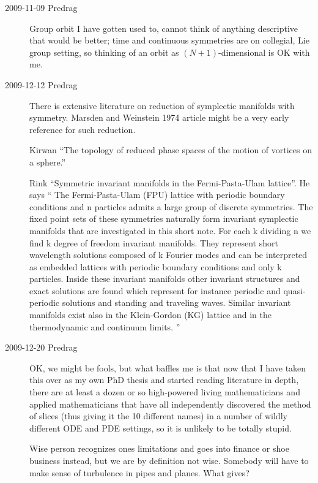 \begin{description}
\item[2009-11-09 Predrag]
Group orbit I have gotten used to, cannot think of anything descriptive
that would be better; time and continuous symmetries are on collegial,
Lie group setting, so thinking of an orbit as $(N+1)$-dimensional is OK
with me.

\renewcommand{\LieEl}{\ensuremath{g}}  %
\renewcommand{\gSpace}{\ensuremath{\theta}}   %
\renewcommand{\ssp}{x}
\renewcommand{\sspRed}{\ensuremath{\hat{x}}}  %

\item[2009-12-12 Predrag]
There is extensive literature on reduction of symplectic manifolds with
symmetry.
Marsden and Weinstein 1974 article
might be a very early reference for such reduction.

Kirwan ``The topology of reduced phase spaces of
the motion of vortices on a sphere.''

 Rink
``Symmetric invariant manifolds in
  the  {Fermi-Pasta-Ulam} lattice''. He says ``
The Fermi-Pasta-Ulam (FPU) lattice with periodic boundary
conditions and n particles admits a large group of discrete
symmetries. The fixed point sets of these symmetries naturally
form invariant symplectic manifolds that are investigated in
this short note. For each k dividing n we find k degree of
freedom invariant manifolds. They represent short wavelength
solutions composed of k Fourier modes and can be interpreted as
embedded lattices with periodic boundary conditions and only k
particles. Inside these invariant manifolds other invariant
structures and exact solutions are found which represent for
instance periodic and quasi-periodic solutions and standing and
traveling waves. Similar invariant manifolds exist also in the
Klein-Gordon (KG) lattice and in the thermodynamic and
continuum limits.
''

\item[2009-12-20 Predrag]
	OK, we might be fools, but what baffles me is that now
that I have taken this over as my own PhD thesis and started
reading literature in depth, there are at least a dozen or so
high-powered living mathematicians and applied mathematicians
that have all independently discovered the method of slices
(thus giving it the 10 different names) in a number of wildly
different ODE and PDE settings, so it is unlikely to be
totally stupid.

Wise person recognizes ones limitations and goes into finance
or shoe business instead, but we are by definition not wise.
Somebody will have to make sense of turbulence in pipes and
planes. What gives?


\end{description}

